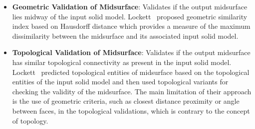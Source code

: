 \begin{itemize}[noitemsep,topsep=2pt,parsep=2pt,partopsep=2pt]
\item \textbf{Geometric Validation of Midsurface}: Validates if the output midsurface lies midway of the input solid model. Lockett~\cite{Lockett2008} proposed geometric similarity index based on Hausdorff distance which provides a measure of the maximum dissimilarity between the midsurface and its associated input solid model.
\item \textbf{Topological Validation of Midsurface}:
Validates if the output midsurface has similar topological connectivity as present in the input solid model. Lockett~\cite{Lockett2008} predicted topological entities of midsurface based on the topological entities of the input solid model and then used topological variants for checking the validity of the midsurface.  The main limitation of their approach is the use of geometric criteria, such as closest distance proximity or angle between faces, in the topological validations, which is contrary to the concept of topology.
\end{itemize}




